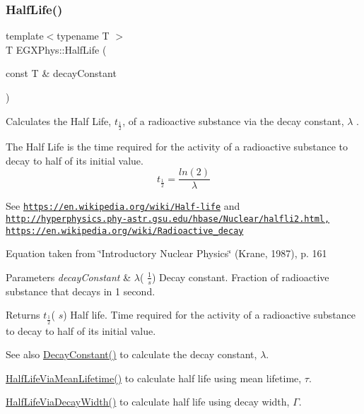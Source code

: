 \subsubsection{\texorpdfstring{Half\+Life()}{HalfLife()}}
{\footnotesize\ttfamily template$<$typename T $>$ \\
T E\+G\+X\+Phys\+::\+Half\+Life (\begin{DoxyParamCaption}\item[{const T \&}]{decay\+Constant }\end{DoxyParamCaption})}



Calculates the Half Life, $t_{\frac{1}{2}}$, of a radioactive substance via the decay constant, $\lambda$ . 

The Half Life is the time required for the activity of a radioactive substance to decay to half of its initial value. \[t_{\frac{1}{2}}=\frac{ln(2)}{\lambda}\]

See \href{https://en.wikipedia.org/wiki/Half-life}{\tt https\+://en.\+wikipedia.\+org/wiki/\+Half-\/life} and \href{http://hyperphysics.phy-astr.gsu.edu/hbase/Nuclear/halfli2.html,}{\tt http\+://hyperphysics.\+phy-\/astr.\+gsu.\+edu/hbase/\+Nuclear/halfli2.\+html,} \href{https://en.wikipedia.org/wiki/Radioactive_decay}{\tt https\+://en.\+wikipedia.\+org/wiki/\+Radioactive\+\_\+decay}

Equation taken from \char`\"{}\+Introductory Nuclear Physics\char`\"{} (Krane, 1987), p. 161


\begin{DoxyParams}{Parameters}
{\em decay\+Constant} & $\lambda$( $\frac{1}{s}$) Decay constant. Fraction of radioactive substance that decays in 1 second. \\
\hline
\end{DoxyParams}
\begin{DoxyReturn}{Returns}
$t_{\frac{1}{2}}$( $s$) Half life. Time required for the activity of a radioactive substance to decay to half of its initial value. 
\end{DoxyReturn}
\begin{DoxySeeAlso}{See also}
\hyperlink{group___atomic_ga904edce5aad441b4a0873b3b1a83c7f2}{Decay\+Constant()} to calculate the decay constant, $\lambda$. 

\hyperlink{group___half_life_gacddef16b62e98b214ec8dd8af7da7dce}{Half\+Life\+Via\+Mean\+Lifetime()} to calculate half life using mean lifetime, $\tau$. 

\hyperlink{group___half_life_gaba3fda944d1a68ee1016a1f2f5809359}{Half\+Life\+Via\+Decay\+Width()} to calculate half life using decay width, $\Gamma$. 
\end{DoxySeeAlso}
\mbox{\label{group___half_life_gaba3fda944d1a68ee1016a1f2f5809359}} 
